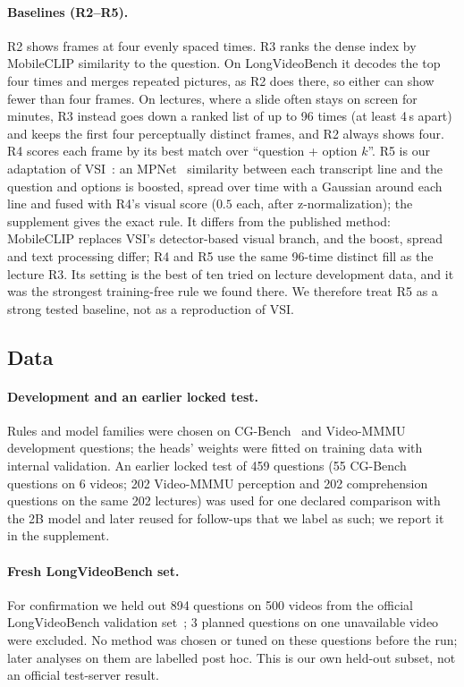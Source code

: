 \paragraph{Baselines (R2--R5).}
R2 shows frames at four evenly spaced times.
R3 ranks the dense index by MobileCLIP similarity to the question.
On LongVideoBench it decodes the top four times and merges repeated pictures, as R2 does there, so either can show fewer than four frames.
On lectures, where a slide often stays on screen for minutes, R3 instead goes down a ranked list of up to 96 times (at least 4\,s apart) and keeps the first four perceptually distinct frames, and R2 always shows four.
R4 scores each frame by its best match over ``question + option $k$''.
R5 is our adaptation of VSI~\cite{he2025vsi}: an MPNet~\cite{song2020mpnet} similarity between each transcript line and the question and options is boosted, spread over time with a Gaussian around each line and fused with R4's visual score ($0.5$ each, after z-normalization); the supplement gives the exact rule.
It differs from the published method: MobileCLIP replaces VSI's detector-based visual branch, and the boost, spread and text processing differ; R4 and R5 use the same 96-time distinct fill as the lecture R3.
Its setting is the best of ten tried on lecture development data, and it was the strongest training-free rule we found there.
We therefore treat R5 as a strong tested baseline, not as a reproduction of VSI.

\subsection{Data}
\label{sec:data}

\paragraph{Development and an earlier locked test.}
Rules and model families were chosen on CG-Bench~\cite{chen2024cgbench} and Video-MMMU~\cite{hu2025videommmu} development questions; the heads' weights were fitted on training data with internal validation.
An earlier locked test of 459 questions (55 CG-Bench questions on 6 videos; 202 Video-MMMU perception and 202 comprehension questions on the same 202 lectures) was used for one declared comparison with the 2B model and later reused for follow-ups that we label as such; we report it in the supplement.

\paragraph{Fresh LongVideoBench set.}
For confirmation we held out 894 questions on 500 videos from the official LongVideoBench validation set~\cite{wu2024longvideobench}; 3 planned questions on one unavailable video were excluded.
No method was chosen or tuned on these questions before the run; later analyses on them are labelled post hoc.
This is our own held-out subset, not an official test-server result.


